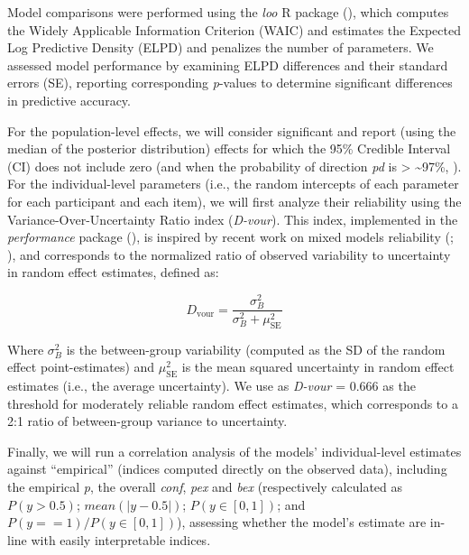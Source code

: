 \documentclass[
  jou,
  floatsintext,
  longtable,
  nolmodern,
  notxfonts,
  notimes,
  colorlinks=true,linkcolor=blue,citecolor=blue,urlcolor=blue]{apa7}
\begin{document}
Model comparisons were performed using the \emph{loo} R package
(), which
computes the Widely Applicable Information Criterion (WAIC) and
estimates the Expected Log Predictive Density (ELPD) and penalizes the
number of parameters. We assessed model performance by examining ELPD
differences and their standard errors (SE), reporting corresponding
\emph{p}-values to determine significant differences in predictive
accuracy.

For the population-level effects, we will consider significant and
report (using the median of the posterior distribution) effects for
which the 95\% Credible Interval (CI) does not include zero (and when
the probability of direction \emph{pd} is \textgreater{}
\textasciitilde97\%, ). For the individual-level parameters (i.e.,
the random intercepts of each parameter for each participant and each
item), we will first analyze their reliability using the
Variance-Over-Uncertainty Ratio index (\emph{D-vour}). This index,
implemented in the \emph{performance} package
(), is
inspired by recent work on mixed models reliability
(;
), and
corresponds to the normalized ratio of observed variability to
uncertainty in random effect estimates, defined as:

\[
D_{\text{vour}} = \frac{\sigma_B^2}{\sigma_B^2 + \mu_{\text{SE}}^2}
\]

Where \(\sigma_B^2\) is the between-group variability (computed as the
SD of the random effect point-estimates) and \(\mu_{\text{SE}}^2\) is
the mean squared uncertainty in random effect estimates (i.e., the
average uncertainty). We use as \emph{D-vour} = 0.666 as the threshold
for moderately reliable random effect estimates, which corresponds to a
2:1 ratio of between-group variance to uncertainty.

Finally, we will run a correlation analysis of the models'
individual-level estimates against ``empirical'' (indices computed
directly on the observed data), including the empirical \emph{p}, the
overall \emph{conf}, \emph{pex} and \emph{bex} (respectively calculated
as \(P(y > 0.5)\); \(mean(|y - 0.5|)\); \(P(y \in [0, 1])\); and
\(P(y == 1) / P(y \in [0, 1])\)), assessing whether the model's estimate
are in-line with easily interpretable indices.
\end{document}
